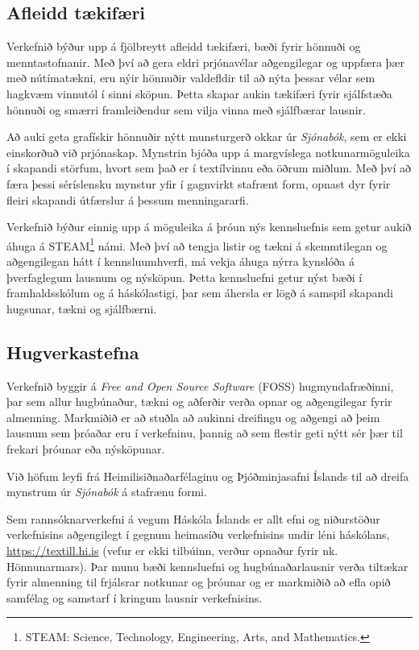 \documentclass[a4paper,12pt,twoside]{article}
\begin{document}
\subsection{Afleidd tækifæri}
Verkefnið býður upp á fjölbreytt afleidd tækifæri, bæði fyrir hönnuði og menntastofnanir. Með því að gera eldri prjónavélar aðgengilegar og uppfæra þær með nútímatækni, eru nýir hönnuðir valdefldir til að nýta þessar vélar sem hagkvæm vinnutól í sinni sköpun. Þetta skapar aukin tækifæri fyrir sjálfstæða hönnuði og smærri framleiðendur sem vilja vinna með sjálfbærar lausnir.

Að auki geta grafískir hönnuðir nýtt munsturgerð okkar úr \textit{Sjónabók}, sem er ekki einskorðuð við prjónaskap. Mynstrin bjóða upp á margvíslega notkunarmöguleika í skapandi störfum, hvort sem það er í textílvinnu eða öðrum miðlum. Með því að færa þessi séríslensku mynstur yfir í gagnvirkt stafrænt form, opnast dyr fyrir fleiri skapandi útfærslur á þessum menningararfi.

Verkefnið býður einnig upp á möguleika á þróun nýs kennsluefnis sem getur aukið áhuga á STEAM\footnote{STEAM: Science, Technology, Engineering, Arts, and Mathematics.} námi. Með því að tengja listir og tækni á skemmtilegan og aðgengilegan hátt í kennsluumhverfi, má vekja áhuga nýrra kynslóða á þverfaglegum lausnum og nýsköpun. Þetta kennsluefni getur nýst bæði í framhaldsskólum og á háskólastigi, þar sem áhersla er lögð á samspil skapandi hugsunar, tækni og sjálfbærni.


\subsection{Hugverkastefna}
Verkefnið byggir á \textit{Free and Open Source Software} (FOSS) hugmyndafræðinni, þar sem allur hugbúnaður, tækni og aðferðir verða opnar og aðgengilegar fyrir almenning. Markmiðið er að stuðla að aukinni dreifingu og aðgengi að þeim lausnum sem þróaðar eru í verkefninu, þannig að sem flestir geti nýtt sér þær til frekari þróunar eða nýsköpunar.

Við höfum leyfi frá Heimilisiðnaðarfélaginu og Þjóðminjasafni Íslands til að dreifa mynstrum úr \textit{Sjónabók} á stafrænu formi. 

Sem rannsóknarverkefni á vegum Háskóla Íslands er allt efni og niðurstöður verkefnisins aðgengilegt í gegnum heimasíðu verkefnisins undir léni háskólans, \url{https://textill.hi.is} (vefur er ekki tilbúinn, verður opnaður fyrir nk. Hönnunarmars). Þar munu bæði kennsluefni og hugbúnaðarlausnir verða tiltækar fyrir almenning til frjálsrar notkunar og þróunar og er markmiðið að efla opið samfélag og samstarf í kringum lausnir verkefnisins.
\end{document}
